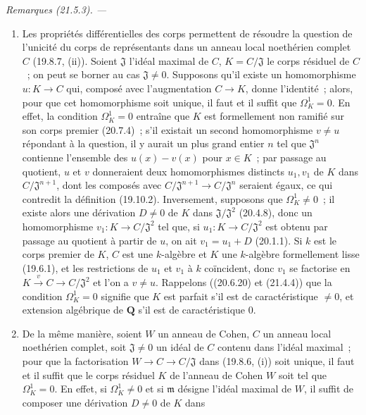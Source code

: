 \documentclass[10pt,oneside]{book}
\makeatletter
\newcommand{\setmanualcurrentlabel}[1]{\def\@currentlabel{#1}}
\newenvironment{remarks}[1][]{%
  \setmanualcurrentlabel{#1}\par\medskip\noindent\itshape Remarques (#1). ---\ }{\par}
\makeatother
\begin{document}
\begin{remarks}[21.5.3]
\label{0.21.5.3-fr}
\begin{enumerate}
  \item[(i)] Les propriétés différentielles des corps permettent de résoudre la
  question de l'unicité du corps de représentants dans un anneau local
  noethérien complet $C$ (19.8.7, (ii)). Soient $\mathfrak J$ l'idéal maximal
  de $C$, $K=C/\mathfrak J$ le corps résiduel de $C$~; on peut se borner au
  cas $\mathfrak J\ne0$. Supposons qu'il existe un homomorphisme $u:K\to C$
  qui, composé avec l'augmentation $C\to K$, donne l'identité~; alors, pour
  que cet homomorphisme soit unique, il faut et il suffit que
  $\Omega^1_K=0$. En effet, la condition $\Omega^1_K=0$ entraîne que $K$ est
  formellement non ramifié sur son corps premier (20.7.4)~; s'il existait un
  second homomorphisme $v\ne u$ répondant à la question, il y aurait un plus
  grand entier $n$ tel que $\mathfrak J^n$ contienne l'ensemble des
  $u(x)-v(x)$ pour $x\in K$~; par passage au quotient, $u$ et $v$ donneraient
  deux homomorphismes distincts $u_1,v_1$ de $K$ dans
  $C/\mathfrak J^{n+1}$, dont les composés avec
  $C/\mathfrak J^{n+1}\to C/\mathfrak J^n$ seraient égaux, ce qui contredit
  la définition (19.10.2). Inversement, supposons que $\Omega^1_K\ne0$~; il
  existe alors une dérivation $D\ne0$ de $K$ dans
  $\mathfrak J/\mathfrak J^2$ (20.4.8), donc un homomorphisme
  $v_1:K\to C/\mathfrak J^2$ tel que, si $u_1:K\to C/\mathfrak J^2$ est
  obtenu par passage au quotient à partir de $u$, on ait $v_1=u_1+D$
  (20.1.1). Si $k$ est le corps premier de $K$, $C$ est une $k$-algèbre et
  $K$ une $k$-algèbre formellement lisse (19.6.1), et les restrictions de
  $u_1$ et $v_1$ à $k$ coïncident, donc $v_1$ se factorise en
  $K\xrightarrow{v}C\to C/\mathfrak J^2$ et l'on a $v\ne u$.
  Rappelons ((20.6.20) et (21.4.4)) que la condition $\Omega^1_K=0$ signifie
  que $K$ est parfait s'il est de caractéristique $\ne0$, et extension
  algébrique de $\mathbf Q$ s'il est de caractéristique $0$.
  \item[(ii)] De la même manière, soient $W$ un anneau de Cohen, $C$ un anneau
  local noethérien complet, soit $\mathfrak J\ne0$ un idéal de $C$ contenu dans
  l'idéal maximal~; pour que la factorisation $W\to C\to C/\mathfrak J$
  dans (19.8.6, (i)) soit unique, il faut et il suffit que le corps résiduel
  $K$ de l'anneau de Cohen $W$ soit tel que $\Omega^1_K=0$. En effet, si
  $\Omega^1_K\ne0$ et si $\mathfrak m$ désigne l'idéal maximal de $W$, il
  suffit de composer une dérivation $D\ne0$ de $K$ dans

\end{enumerate}
\end{remarks}
\end{document}
